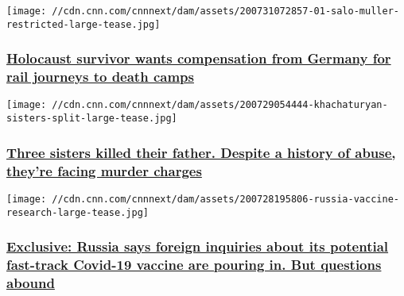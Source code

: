 \href{/2020/07/31/europe/german-railway-holocaust-scli-intl/index.html}{}

\texttt{[image: //cdn.cnn.com/cnnnext/dam/assets/200731072857-01-salo-muller-restricted-large-tease.jpg]}

\hypertarget{holocaust-survivor-wants-compensation-from-germany-for-rail-journeys-to-death-camps-}{%
\subsubsection{\texorpdfstring{\href{/2020/07/31/europe/german-railway-holocaust-scli-intl/index.html}{Holocaust
survivor wants compensation from Germany for rail journeys to death
camps
}}{Holocaust survivor wants compensation from Germany for rail journeys to death camps }}\label{holocaust-survivor-wants-compensation-from-germany-for-rail-journeys-to-death-camps-}}

\href{/2020/07/30/europe/khachaturyan-sisters-trial-russia-intl/index.html}{}

\texttt{[image: //cdn.cnn.com/cnnnext/dam/assets/200729054444-khachaturyan-sisters-split-large-tease.jpg]}

\hypertarget{three-sisters-killed-their-father-despite-a-history-of-abuse-theyre-facing-murder-charges}{%
\subsubsection{\texorpdfstring{\href{/2020/07/30/europe/khachaturyan-sisters-trial-russia-intl/index.html}{Three
sisters killed their father. Despite a history of abuse, they're facing
murder
charges}}{Three sisters killed their father. Despite a history of abuse, they're facing murder charges}}\label{three-sisters-killed-their-father-despite-a-history-of-abuse-theyre-facing-murder-charges}}

\href{/2020/07/28/europe/russia-coronavirus-vaccine-approval-intl/index.html}{}

\texttt{[image: //cdn.cnn.com/cnnnext/dam/assets/200728195806-russia-vaccine-research-large-tease.jpg]}

\hypertarget{exclusive-russia-says-foreign-inquiries-about-its-potential-fast-track-covid-19-vaccine-are-pouring-in-but-questions-abound}{%
\subsubsection{\texorpdfstring{\href{/2020/07/28/europe/russia-coronavirus-vaccine-approval-intl/index.html}{Exclusive:
Russia says foreign inquiries about its potential fast-track Covid-19
vaccine are pouring in. But questions
abound}}{Exclusive: Russia says foreign inquiries about its potential fast-track Covid-19 vaccine are pouring in. But questions abound}}\label{exclusive-russia-says-foreign-inquiries-about-its-potential-fast-track-covid-19-vaccine-are-pouring-in-but-questions-abound}}

